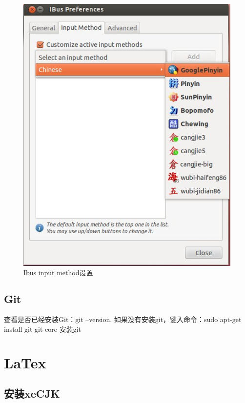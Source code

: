 \documentclass[paper=a4,fontsize=11pt]{article}
\begin{document}
\begin{enumerate}
		\begin{figure}[htbp]
			\centering
			\includegraphics[scale=0.7]{IbusSetupGooglePinyin.jpeg}
			\caption{Ibus input method设置}
			\label{IbusSetupGooglePinyin}
		\end{figure}
		
		
	\end{enumerate}
	
	\subsection{Git}
	
	查看是否已经安装Git：git --version.
	如果没有安装git，键入命令：sudo apt-get install git git-core 安装git
	
	
	\section{LaTex}
	
	\subsection{安装xeCJK}
	
\end{document}
